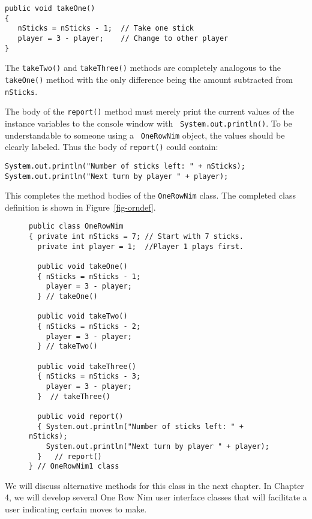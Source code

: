 \begin{jjjlisting}
\begin{lstlisting}
public void takeOne()
{
   nSticks = nSticks - 1;  // Take one stick
   player = 3 - player;    // Change to other player
}
\end{lstlisting}
\end{jjjlisting}

\noindent The {\tt takeTwo()} and {\tt takeThree()} methods are completely
analogous to the {\tt takeOne()} method with the only difference being
the amount subtracted from {\tt nSticks}.

The body of the {\tt report()} method must merely print the current
values of the instance variables to the console window with {\tt
System.out.println()}.  To be understandable to someone using a {\tt
OneRowNim} object, the values should be clearly labeled.  Thus the body
of {\tt report()} could contain:

\begin{jjjlisting}
\begin{lstlisting}
System.out.println("Number of sticks left: " + nSticks);
System.out.println("Next turn by player " + player);
\end{lstlisting}
\end{jjjlisting}

\noindent This completes the method bodies of the {\tt OneRowNim} class.
The completed class definition is shown in Figure~\ref{fig-orndef}.
\begin{figure}[tb]
\jjjprogstart
\begin{jjjlisting}[27pc]
\begin{lstlisting}
public class OneRowNim 
{ private int nSticks = 7; // Start with 7 sticks.
  private int player = 1;  //Player 1 plays first.

  public void takeOne()
  { nSticks = nSticks - 1;
    player = 3 - player;
  } // takeOne()

  public void takeTwo()
  { nSticks = nSticks - 2;
    player = 3 - player;
  } // takeTwo()

  public void takeThree()
  { nSticks = nSticks - 3;
    player = 3 - player;
  }  // takeThree()

  public void report()
  { System.out.println("Number of sticks left: " + nSticks);
    System.out.println("Next turn by player " + player);
  }   // report()
} // OneRowNim1 class
\end{lstlisting}
\end{jjjlisting}
\end{figure}
We will discuss alternative methods for this class in the next chapter.
In Chapter 4, we will develop several One Row Nim user interface classes
that will facilitate a user indicating certain moves to make.


